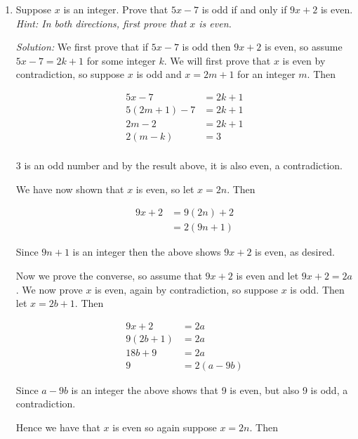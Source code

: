\documentclass[12pt]{article}
\begin{document}
{\begin{enumerate}
So $x-\frac 2 x \leq 1$ which is what we wanted. \qed

(c) Contradiction: For contradiction suppose both $x - \frac 2 x > 1$ and that $x\leq 2$.  By the argument in part (b) we already know that $x\leq 2$ entails $x - \frac 2 x \leq 1$. This contradicts our first assumption.  \Lightning\qed
	
\item Suppose $x$ is an integer. Prove that $5x - 7$ is odd if and only if $9x + 2$ is even. \emph{Hint: In both directions, first prove that $x$ is even.}

{\it Solution:} We first prove that if $5x - 7$ is odd then $9x+2$ is even, so assume $5x-7 = 2k+1$ for some integer $k$.  We will first prove that $x$ is even by contradiction, so suppose $x$ is odd and $x = 2m+1$ for an integer $m$.  Then 

\begin{align*}
    5x-7 &= 2k +1\\
    5(2m+1)-7 &= 2k+1 \\
    2m-2 &= 2k+1 \\
    2(m-k) &= 3 \\
\end{align*}

3 is an odd number and by the result above, it is also even, a contradiction.  \Lightning

We have now shown that $x$ is even, so let $x = 2n$.  Then 

\begin{align*}
    9x+2 &= 9(2n)+2\\
    &= 2(9n+1)
\end{align*}

Since $9n+1$ is an integer then the above shows $9x+2$ is even, as desired. 

Now we prove the converse, so assume that $9x+2$ is even and let $9x+2 = 2a$.  We now prove $x$ is even, again by contradiction, so suppose $x$ is odd.  Then let $x = 2b+1$.  Then 

\begin{align*}
    9x+2 &= 2a \\
    9(2b+1) &= 2a \\
    18b+9 &= 2a \\
    9 &= 2(a-9b)
\end{align*}

Since $a-9b$ is an integer the above shows that 9 is even, but also 9 is odd, a contradiction.  \Lightning

Hence we have that $x$ is even so again suppose $x=2n$.  Then 


\end{enumerate}}
\end{document}

